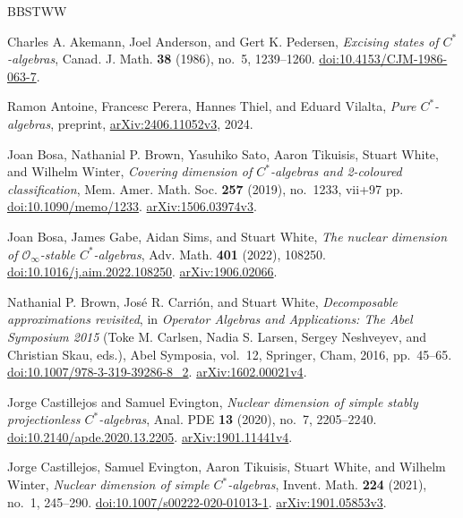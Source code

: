 \begin{thebibliography}{BBSTWW}
\raggedright

Charles A. Akemann, Joel Anderson, and Gert K. Pedersen,
\emph{Excising states of $C^*$-algebras},
Canad. J. Math. \textbf{38} (1986), no.~5, 1239--1260.
\href{https://doi.org/10.4153/CJM-1986-063-7}{doi:10.4153/CJM-1986-063-7}.

Ramon Antoine, Francesc Perera, Hannes Thiel, and Eduard Vilalta,
\emph{Pure $C^*$-algebras},
preprint, \href{https://arxiv.org/abs/2406.11052v3}{arXiv:2406.11052v3},
2024.

Joan Bosa, Nathanial P. Brown, Yasuhiko Sato, Aaron Tikuisis,
Stuart White, and Wilhelm Winter,
\emph{Covering dimension of $C^*$-algebras and 2-coloured classification},
Mem. Amer. Math. Soc. \textbf{257} (2019), no.~1233, vii+97 pp.
\href{https://doi.org/10.1090/memo/1233}{doi:10.1090/memo/1233}.
\href{https://arxiv.org/abs/1506.03974v3}{arXiv:1506.03974v3}.

Joan Bosa, James Gabe, Aidan Sims, and Stuart White,
\emph{The nuclear dimension of $\mathcal O_\infty$-stable $C^*$-algebras},
Adv. Math. \textbf{401} (2022), 108250.
\href{https://doi.org/10.1016/j.aim.2022.108250}{doi:10.1016/j.aim.2022.108250}.
\href{https://arxiv.org/abs/1906.02066}{arXiv:1906.02066}.

Nathanial P. Brown, Jos\'e R. Carri\'on, and Stuart White,
\emph{Decomposable approximations revisited},
in \emph{Operator Algebras and Applications: The Abel Symposium 2015}
(Toke M. Carlsen, Nadia S. Larsen, Sergey Neshveyev, and Christian Skau, eds.),
Abel Symposia, vol.~12, Springer, Cham, 2016, pp.~45--65.
\href{https://doi.org/10.1007/978-3-319-39286-8_2}{doi:10.1007/978-3-319-39286-8\_2}.
\href{https://arxiv.org/abs/1602.00021v4}{arXiv:1602.00021v4}.

Jorge Castillejos and Samuel Evington,
\emph{Nuclear dimension of simple stably projectionless $C^*$-algebras},
Anal. PDE \textbf{13} (2020), no.~7, 2205--2240.
\href{https://doi.org/10.2140/apde.2020.13.2205}{doi:10.2140/apde.2020.13.2205}.
\href{https://arxiv.org/abs/1901.11441v4}{arXiv:1901.11441v4}.

Jorge Castillejos, Samuel Evington, Aaron Tikuisis, Stuart White,
and Wilhelm Winter,
\emph{Nuclear dimension of simple $C^*$-algebras},
Invent. Math. \textbf{224} (2021), no.~1, 245--290.
\href{https://doi.org/10.1007/s00222-020-01013-1}{doi:10.1007/s00222-020-01013-1}.
\href{https://arxiv.org/abs/1901.05853v3}{arXiv:1901.05853v3}.


\end{thebibliography}
